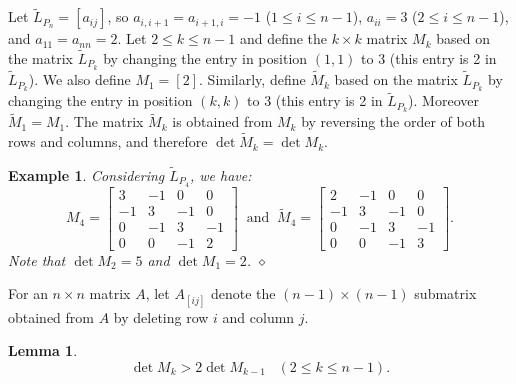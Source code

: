 \documentclass[12pt]{article}
\newtheorem{lemma}[theorem]{Lemma}
\newtheorem{example}{Example}
\begin{document}
Let $\tilde{L}_{P_n}=[a_{ij}]$, so  $a_{i,i+1}=a_{i+1,i}=-1$ ($1 \le i \le n-1$), $a_{ii}=3$ ($2\le i \le n-1$), and $a_{11}=a_{nn}=2$. Let $2\le k \le n-1$ and define the $k \times k$ matrix $M_k$ based on the matrix $\tilde{L}_{P_k}$ by changing the entry in position $(1,1)$ to 3 (this entry is 2 in $\tilde{L}_{P_k}$). We also define $M_1=[2]$. Similarly, define $\tilde{M}_k$ based on the matrix $\tilde{L}_{P_k}$ by changing the entry in position $(k,k)$ to 3 (this entry is 2 in $\tilde{L}_{P_k}$). Moreover $\tilde{M}_1=M_1$. The matrix $\tilde{M}_k$ is obtained from $M_k$ by 
reversing the order of both rows and columns, and therefore $\det \tilde{M}_k=\det M_k$.

\begin{example}
{\rm Considering $\tilde{L}_{P_4}$, we have:
%
\[
M_4=
\left[
\begin{array}{rrrr}
   3 & -1 & 0 & 0 \\
    -1&  3 & -1 & 0  \\
    0 & -1&  3 & -1   \\
   0 & 0 & -1&  2 
\end{array}
\right] \;\;\mbox{and}\; \;
\tilde{M}_4=\left[
\begin{array}{rrrr}
   2 & -1 & 0 & 0 \\
    -1&  3 & -1 & 0  \\
    0 & -1&  3 & -1   \\
   0 & 0 & -1&  3 
\end{array}
\right].
\]
Note that $\det M_2=5$ and $\det M_1=2$.} \hfill{$\diamond$}
\end{example} 

\noindent For an $n \times n$  matrix $A$, let $A_{[ij]}$ denote the $(n-1) \times (n-1)$  submatrix obtained from $A$ by deleting row $i$ and column $j$. 

\begin{lemma}
 \label{lem:det-recursive}
 \begin{equation}
  \label{eq:double-property}
     \det M_k > 2  \det M_{k-1} \;\;\;(2\le k \le n-1).
 \end{equation}
\end{lemma}
\end{document}
